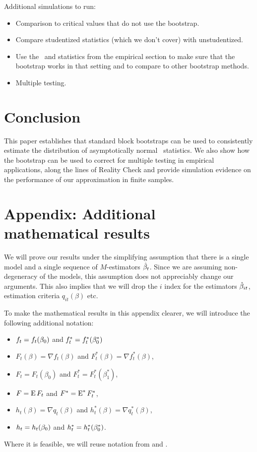 \documentclass[12pt,fleqn]{article}
\begin{document}
Additional simulations to run:
\begin{itemize}
\item Comparison to  critical values that do not use
  the bootstrap.
\item Compare studentized statistics (which we don't cover) with
  unstudentized.
\item Use the \dgp\ and statistics from the empirical section to make
  sure that the bootstrap works in that setting and to compare to
  other bootstrap methods.
\item Multiple testing.
\end{itemize}

\section{Conclusion}\label{sec:4}
This paper establishes that standard block bootstraps can be used to
consistently estimate the distribution of asymptotically normal \oos\
statistics. We also show how the bootstrap can be used to correct for
multiple testing in empirical applications, along the lines of
 Reality Check and provide simulation evidence on the
performance of our approximation in finite samples.

\appendix
\section*{Appendix: Additional mathematical results}\label{sec:B}
\renewcommand{\thesubsection}{\Alph{subsection}}

We will prove our results under the simplifying assumption that there
is a single model and a single sequence of $M$-estimators $\hat \beta_t$. Since we are assuming
non-degeneracy of the models, this assumption does not appreciably
change our arguments. This also implies that we will drop the $i$
index for the estimators $\hat \beta_{it}$, estimation criteria
$q_{it}(\beta)$ etc.

To make the mathematical results in this appendix clearer, we will
introduce the following additional notation:
\begin{itemize}
\item $f_t = f_t(\beta_0)$ and $f_t^* = f_t^*(\beta_0^*)$
\item $F_t(\beta) = \nabla f_t(\beta)$ and $F_t^*(\beta) = \nabla
  f_t^*(\beta)$,
\item $F_t = F_t(\beta_0)$ and $F_t^* = F_t^*(\beta_1^*)$,
\item $F = \operatorname{E} F_t$ and $F^* = \operatorname{E}^* F_t^*$,
\item $h_t(\beta) = \nabla q_t(\beta)$ and $h_t^*(\beta) = \nabla q_t^*(\beta)$,
\item $h_t = h_t(\beta_0)$ and $h_t^* = h_t^*(\beta_0^*)$.
\end{itemize}
Where it is feasible, we will reuse notation from \cite{Wes:96} and
\cite{WeM:98}.
\end{document}
